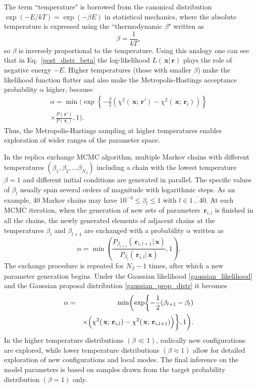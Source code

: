 \documentclass[preprint2]{aastex}
\newcommand{\bfr}{\,\mathbf{r}}
\newcommand{\bfx}{\,\mathbf{x}}
\begin{document}
The term ``temperature" is borrowed from the canonical distribution $\exp \left( -E/{kT} \right) = \exp \left( -\beta E \right)$ in statistical mechanics, where the absolute temperature is expressed using the ``thermodynamic $\beta$" written as 
\begin{equation}
	\beta = \frac{1}{kT},
\end{equation}
so $\beta$ is inversely proportional to the temperature. Using this analogy one can see that in Eq.~\eqref{post_distr_beta}  the log-likelihood $L(\bfx|\bfr)$ plays the role of negative energy $-E$. Higher temperatures (those with smaller $\beta$) make the likelihood function flatter and also make the Metropolis-Hastings acceptance probability $\alpha$ higher, because
\begin{eqnarray}
  \label{accept_probab_beta}
  \alpha = \min \biggl( \exp \left\lbrace -\frac{\beta}{2}\left( \chi^2(\bfx;\bfr') - \chi^2(\bfx;\bfr_i) \right)
              \right\rbrace \nonumber \\
         \times  \frac{P(\bfr')} {P(\bfr_i)}, 1 \biggr).  
\end{eqnarray}
Thus, the Metropolis-Hastings sampling at higher temperatures enables exploration of wider ranges of the parameter space. 

In the replica exchange MCMC algorithm, multiple Markov chains with different temperatures $(\beta_1,\beta_2, ... \beta_{N_\beta})$ including a chain with the lowest temperature $\beta=1$ and different initial conditions are generated in parallel. The specific values of $\beta_l$ usually span several orders of magnitude with logarithmic steps. As an example, 40 Markov chains may have $10^{-4} \leqslant \beta_l \leqslant 1$ with $l \in \overline{1\,..\,40}$. At each MCMC iteration, when the generation of new sets of parameters $\bfr_{i,l}$ is finished in all the chains, the newly generated elements of adjacent chains at the temperatures $\beta_l$ and $\beta_{l+1}$ are exchanged with a probability $\alpha$ written as
\begin{equation}
  \label{exchange_probab}
  \alpha =  \min \left( \frac{P_{\beta_{l+1}}(\bfr_{i,l+1}|\bfx)} 
            {P_{\beta_{l}}(\bfr_{i,l}|\bfx)}, 1 \right) .
\end{equation}
The exchange procedure is repeated for $N_\beta - 1$ times, after which a new parameter generation begins. Under the Gaussian  likelihood \eqref{gaussian_likelihood} and the Gaussian proposal distribution \eqref{gaussian_prop_distr} it becomes
\begin{eqnarray}
  \label{accept_probab_beta2}
  \alpha &=& \min \biggl( \exp \biggl\lbrace -\frac{1}{2}(\beta_{l+1} - \beta_{l}) \nonumber \\
         &&\times  \Bigl( \chi^2(\bfx;\bfr_{i,l}) -
                 \chi^2(\bfx;\bfr_{i,l+1}) \Bigr) \biggr\rbrace, 1 \biggr)      .
\end{eqnarray}
In the higher temperature distributions $(\beta \ll 1)$, radically new configurations are explored, while lower temperature distributions  $(\beta \approx 1)$ allow for detailed exploration of new configurations and local modes. The final inference on the model parameters is based on samples drawn from the target probability distribution $(\beta=1)$ only.
\end{document}
